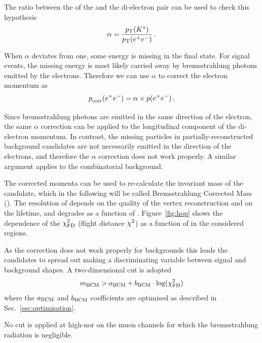 The ratio between the \pt of the \Kstarz and the di-electron pair can be used to check this hypothesis
%
$$\alpha = \frac{\mbox{$p_{\rm T}$}({{K}^*})}{\mbox{$p_{\rm T}$}(e^+ e^-)} \, .$$

When $\alpha$ deviates from one, some energy is missing in the final state. 
For signal events, the missing energy is most likely carried away by bremsstrahlung photons emitted
by the electrons. Therefore we can use $\alpha$ to correct the electron momentum as
%
$$\mbox{$p$}_{\textrm{corr}}(e^+ e^-) = \alpha \times \mbox{$p$}(e^+ e^-) \, .$$

Since bremsstrahlung photons are emitted in the same direction of the electron, the same $\alpha$ correction can
be applied to the longitudinal component of the di-electron momentum.
In contrast, the missing particles in partially-reconstructed background candidates are not necessarily emitted in the
direction of the electrons, and therefore the $\alpha$ correction does not work properly.
A similar argument applies to the combinatorial background. 

The corrected momenta can be used to re-calculate the invariant mass of the \Bz candidate, which in the following will be
called Bremsstrahlung Corrected Mass (\mbcm). The resolution of \mbcm depends on the quality of the vertex reconstruction
and on the \Bz lifetime, and degrades as a function of \qsq. Figure~\ref{fig:hop} shows the dependence of the \Bz $\chi^2_{\rm FD}$ 
(flight distance $\chi^2$) as a function of \mbcm in the considered \qsq regions. 

As the correction does not work properly for backgrounds this leads the candidates to spread out making \mbcm 
a discriminating variable between signal and background shapes. A two-dimensional cut is adopted
%
$$m_{\rm BCM} > a_{\rm BCM} + b_{\rm BCM} \cdot \log(\chi^2_{\rm FD})$$
%
where the $a_{\rm BCM}$ and $b_{\rm BCM}$ coefficients are optimised as described in Sec.~\ref{sec:optimisation}.

No cut is applied at high-\qsq nor on the muon channels for which the bremsstrahlung radiation is negligible.




